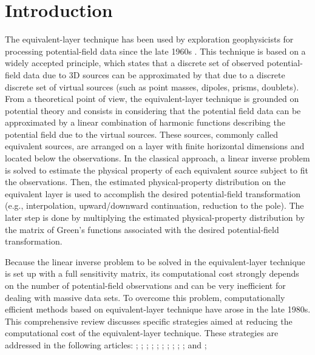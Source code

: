\section{Introduction}

The equivalent-layer technique has been used by exploration geophysicists for processing potential-field 
data since the late 1960s \citep{dampney1969}. 
This technique is based on a widely accepted principle, which states that a discrete set of observed 
potential-field data due to 3D sources 
can be approximated by that due to a discrete discrete set of virtual sources (such as point 
masses, dipoles, prisms, doublets). From a theoretical point of view, the equivalent-layer 
technique is grounded on potential theory \citep{kellogg1967} and consists in considering 
that the potential field data can be approximated by a linear combination of harmonic 
functions describing the potential field due to the virtual sources. These sources, commonly 
called equivalent sources, are arranged on a layer with finite horizontal dimensions and 
located below the observations. In the classical approach, a linear inverse problem is 
solved to estimate the physical property of each equivalent source subject to fit the 
observations. Then, the estimated physical-property distribution on the equivalent layer is 
used to accomplish the desired potential-field transformation (e.g., interpolation, 
upward/downward continuation, reduction to the pole). The later step is done by multiplying 
the estimated physical-property distribution by the matrix of Green's functions associated 
with the desired potential-field transformation.

Because the linear inverse problem to be solved in the equivalent-layer technique is set up 
with a full sensitivity matrix, its computational cost strongly depends on the number of 
potential-field observations and can be very inefficient for dealing with massive data sets. 
To overcome this problem, computationally efficient methods based on equivalent-layer 
technique have arose in the late 1980s. 
This comprehensive review discusses specific strategies aimed at reducing the computational cost of the equivalent-layer technique.
These strategies are addressed in the following articles: 
\cite{leao-silva1989};
\cite{cordell1992};
\cite{xia-etal1993};
\cite{mendonca-silva1994};  
\cite{guspi-novara2009};
\cite{li-oldenburg2010};
\cite{oliveirajr-etal2013};
\cite{siqueira-etal2017};
\cite{jirigalatu-ebbing2019};
\citet{takahashi-etal2020,takahashi-etal2022}
\cite{mendonca2020}; and
\cite{soler-uieda2021};


